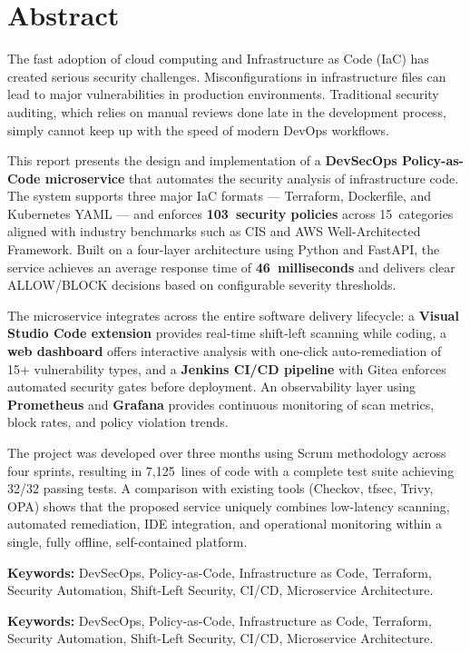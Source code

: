 
\chapter*{Abstract}

The fast adoption of cloud computing and Infrastructure as Code (IaC) has created serious security challenges. Misconfigurations in infrastructure files can lead to major vulnerabilities in production environments. Traditional security auditing, which relies on manual reviews done late in the development process, simply cannot keep up with the speed of modern DevOps workflows.

This report presents the design and implementation of a \textbf{DevSecOps Policy-as-Code microservice} that automates the security analysis of infrastructure code. The system supports three major IaC formats --- Terraform, Dockerfile, and Kubernetes YAML --- and enforces \textbf{103~security policies} across 15~categories aligned with industry benchmarks such as CIS and AWS Well-Architected Framework. Built on a four-layer architecture using Python and FastAPI, the service achieves an average response time of \textbf{46~milliseconds} and delivers clear ALLOW/BLOCK decisions based on configurable severity thresholds.

The microservice integrates across the entire software delivery lifecycle: a \textbf{Visual Studio Code extension} provides real-time shift-left scanning while coding, a \textbf{web dashboard} offers interactive analysis with one-click auto-remediation of 15+ vulnerability types, and a \textbf{Jenkins CI/CD pipeline} with Gitea enforces automated security gates before deployment. An observability layer using \textbf{Prometheus} and \textbf{Grafana} provides continuous monitoring of scan metrics, block rates, and policy violation trends.

The project was developed over three months using Scrum methodology across four sprints, resulting in 7{,}125~lines of code with a complete test suite achieving 32/32 passing tests. A comparison with existing tools (Checkov, tfsec, Trivy, OPA) shows that the proposed service uniquely combines low-latency scanning, automated remediation, IDE integration, and operational monitoring within a single, fully offline, self-contained platform.

\vspace{0.5cm}
\noindent\textbf{Keywords:} DevSecOps, Policy-as-Code, Infrastructure as Code, Terraform, Security Automation, Shift-Left Security, CI/CD, Microservice Architecture.

\vspace{0.5cm}
\noindent\textbf{Keywords:} DevSecOps, Policy-as-Code, Infrastructure as Code, Terraform, Security Automation, Shift-Left Security, CI/CD, Microservice Architecture.

